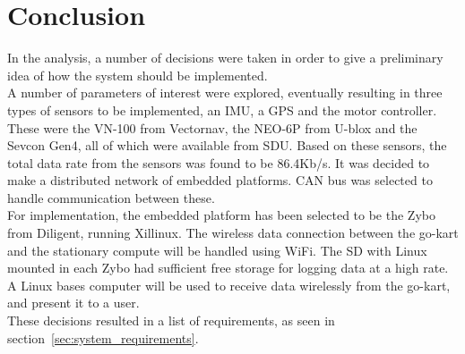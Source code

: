 





\section{Conclusion}
\label{sec:analysisconclusion}
In the analysis, a number of decisions were taken in order to give a preliminary idea of how the system should be implemented. \\

A number of parameters of interest were explored, eventually resulting in three types of sensors to be implemented, an IMU, a GPS and the motor controller.
These were the VN-100 from Vectornav, the NEO-6P from U-blox and the Sevcon Gen4, all of which were available from SDU.
Based on these sensors, the total data rate from the sensors was found to be 86.4Kb/s.
It was decided to make a distributed network of embedded platforms. 
CAN bus was selected to handle communication between these.\\

For implementation, the embedded platform has been selected to be the Zybo from Diligent, running Xillinux.
The wireless data connection between the go-kart and the stationary compute will be handled using WiFi.
The SD with Linux mounted in each Zybo had sufficient free storage for logging data at a high rate.
A Linux bases computer will be used to receive data wirelessly from the go-kart, and present it to a user. \\

These decisions resulted in a list of requirements, as seen in section~\ref{sec:system_requirements}.

